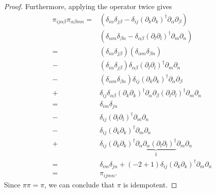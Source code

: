 \documentclass[10pt,a4paper]{amsart}
\begin{document}
\begin{proof}
    Furthermore, applying the operator twice gives
    \begin{equation}
    \begin{split}
        \pi_{i j \alpha \beta} \pi_{\alpha \beta m n} =
        & \left( \delta_{i \alpha} \delta_{j \beta} - \delta_{i j} (\partial_k \partial_k)^{\dagger}
        \partial_\alpha \partial_\beta \right) \\
        & \left( \delta_{\alpha m} \delta_{\beta n} - \delta_{\alpha \beta} (\partial_l \partial_l)^{\dagger} \partial_m \partial_n \right) \\
        = &
        (\delta_{i \alpha} \delta_{j \beta}) (\delta_{\alpha m} \delta_{\beta n}) \\
        - &
        (\delta_{i \alpha} \delta_{j \beta}) \delta_{\alpha \beta} (\partial_l \partial_l)^{\dagger} \partial_m \partial_n \\
        - &
        (\delta_{\alpha m} \delta_{\beta n}) \delta_{i j} (\partial_k \partial_k)^{\dagger} \partial_\alpha \partial_\beta \\
        + &
        \delta_{i j} \delta_{\alpha \beta}
        (\partial_k \partial_k)^{\dagger} \partial_\alpha \partial_\beta
        (\partial_l \partial_l)^{\dagger} \partial_m \partial_n \\
        = &
        \delta_{i m} \delta_{j n} \\
        - & \delta_{i j} (\partial_l \partial_l)^{\dagger} \partial_m \partial_n \\
        - & \delta_{i j} (\partial_k \partial_k)^{\dagger} \partial_m \partial_n \\
        + & \delta_{i j} (\partial_k \partial_k)^{\dagger}
        \underbrace{\partial_\alpha \partial_\alpha (\partial_l
        \partial_l)^{\dagger}}_{1}
        \partial_m \partial_n \\
        = & \delta_{i m} \delta_{j n} + (-2 + 1) \delta_{i j} (\partial_k \partial_k)^{\dagger} \partial_m \partial_n \\
        = & \pi_{i j m n}.
    \end{split}
    \end{equation}
    Since $\pi \pi = \pi$, we
    can conclude that $\pi$ is idempotent.
\end{proof}
\end{document}
